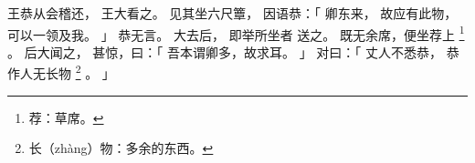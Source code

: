 
\switchcolumn*[\section{}]

王恭从会稽还，
王大看之。
见其坐六尺簟，
因语恭：「
    卿东来，
    故应有此物，
    可以一领及我。
」
恭无言。
大去后，
即举所坐者
送之。
既无余席，便坐荐上%
\footnote{%
    荐：草席。
}%
。
后大闻之，
甚惊，曰：「
    吾本谓卿多，故求耳。
」
对曰：「
    丈人不悉恭，
    恭作人无长物%
    \footnote{%
        长（zhàng）物：多余的东西。
    }%
    。
」

\switchcolumn



